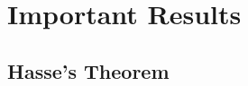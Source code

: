 \documentclass[10pt,handout]{beamer} %
\begin{document}
%
%
%

\section{Important Results}
\subsection{Hasse's Theorem}
\end{document}
